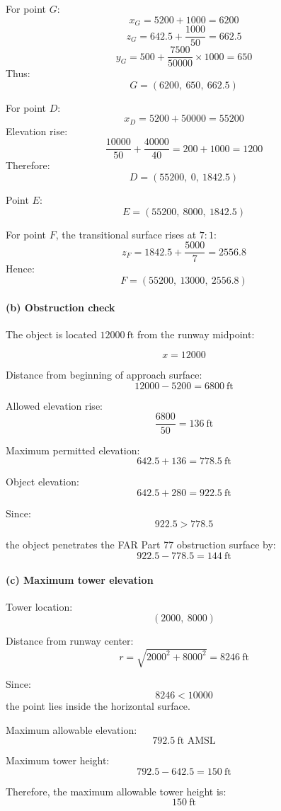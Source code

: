 \documentclass{KPS_assignment}
\begin{document}
\begin{enumerate}
For point \(G\):
\[
x_G = 5200 + 1000 = 6200
\]
\[
z_G = 642.5 + \frac{1000}{50} = 662.5
\]
\[
y_G = 500 + \frac{7500}{50000}\times1000 = 650
\]
Thus:
\[
G=(6200,\ 650,\ 662.5)
\]

For point \(D\):
\[
x_D = 5200 + 50000 = 55200
\]
Elevation rise:
\[
\frac{10000}{50} + \frac{40000}{40}
=200+1000=1200
\]
Therefore:
\[
D=(55200,\ 0,\ 1842.5)
\]

Point \(E\):
\[
E=(55200,\ 8000,\ 1842.5)
\]

For point \(F\), the transitional surface rises at \(7:1\):
\[
z_F = 1842.5 + \frac{5000}{7} = 2556.8
\]
Hence:
\[
F=(55200,\ 13000,\ 2556.8)
\]

\paragraph{(b) Obstruction check}

The object is located \(12000\ \text{ft}\) from the runway midpoint:

\[
x = 12000
\]

Distance from beginning of approach surface:
\[
12000 - 5200 = 6800\ \text{ft}
\]

Allowed elevation rise:
\[
\frac{6800}{50}=136\ \text{ft}
\]

Maximum permitted elevation:
\[
642.5 + 136 = 778.5\ \text{ft}
\]

Object elevation:
\[
642.5 + 280 = 922.5\ \text{ft}
\]

Since:
\[
922.5 > 778.5
\]

the object penetrates the FAR Part 77 obstruction surface by:
\[
922.5 - 778.5 = 144\ \text{ft}
\]

\paragraph{(c) Maximum tower elevation}

Tower location:
\[
(2000,\ 8000)
\]

Distance from runway center:
\[
r=\sqrt{2000^2+8000^2}=8246\ \text{ft}
\]

Since:
\[
8246 < 10000
\]
the point lies inside the horizontal surface.

Maximum allowable elevation:
\[
792.5\ \text{ft AMSL}
\]

Maximum tower height:
\[
792.5 - 642.5 = 150\ \text{ft}
\]

Therefore, the maximum allowable tower height is:
\[
150\ \text{ft}
\]




\end{enumerate}
\end{document}
